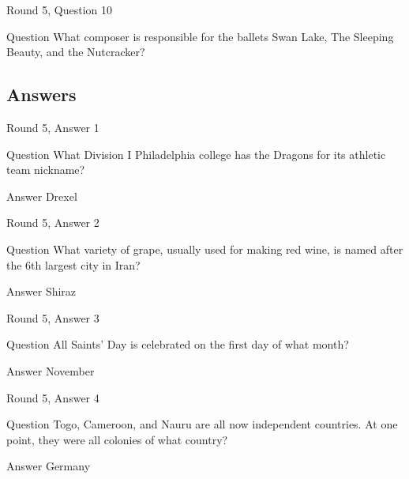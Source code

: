 \documentclass[11pt]{beamer}
\begin{document}
\begin{frame}{Round 5, Question 10}
\begin{block}{Question}
What composer is responsible for the ballets Swan Lake, The Sleeping Beauty, and the Nutcracker\@?
\end{block}
\end{frame}
    
\subsection{Answers}

\begin{frame}{Round 5, Answer 1}
\begin{block}{Question}
What Division I Philadelphia college has the Dragons for its athletic team nickname\@?
\end{block}
\pause{}
\begin{block}{Answer}
Drexel
\end{block}
\end{frame}
    

\begin{frame}{Round 5, Answer 2}
\begin{block}{Question}
What variety of grape, usually used for making red wine, is named after the 6th largest city in Iran\@?
\end{block}
\pause{}
\begin{block}{Answer}
Shiraz
\end{block}
\end{frame}
    

\begin{frame}{Round 5, Answer 3}
\begin{block}{Question}
All Saints' Day is celebrated on the first day of what month\@?
\end{block}
\pause{}
\begin{block}{Answer}
November
\end{block}
\end{frame}
    

\begin{frame}{Round 5, Answer 4}
\begin{block}{Question}
Togo, Cameroon, and Nauru are all now independent countries. At one point, they were all colonies of what country\@?
\end{block}
\pause{}
\begin{block}{Answer}
Germany
\end{block}
\end{frame}
    
\end{document}
